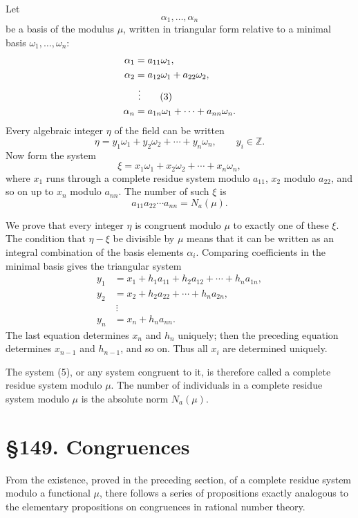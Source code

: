 \documentclass[11pt,a4paper]{book}
\newcommand{\webersection}[2]{\clearpage\section*{\S #1. #2}}
\begin{document}
Let
\begin{equation}
 \alpha_1,
\ldots,
\alpha_n \tag{2}
\end{equation}
be a basis of the modulus \(\mu\), written in triangular form relative to a minimal basis \(\omega_1,
\ldots,
\omega_n\):
\begin{align}
 \alpha_1&=a_{11}\omega_1,\notag\\
 \alpha_2&=a_{12}\omega_1+a_{22}\omega_2,\notag\\
 &\ \vdots \tag{3}\\
 \alpha_n&=a_{1n}\omega_1+
\cdots+a_{nn}\omega_n.
\notag
\end{align}
Every algebraic integer \(\eta\) of the field can be written
\begin{equation}
 \eta=y_1\omega_1+y_2\omega_2+
\cdots+y_n\omega_n,
\qquad y_i\in\mathbb Z. \tag{4}
\end{equation}
Now form the system
\begin{equation}
 \xi=x_1\omega_1+x_2\omega_2+
\cdots+x_n\omega_n, \tag{5}
\end{equation}
where \(x_1\) runs through a complete residue system modulo \(a_{11}\), \(x_2\) modulo \(a_{22}\), and so on up to \(x_n\) modulo \(a_{nn}\).  The number of such \(\xi\) is
\[
 a_{11}a_{22}\cdots a_{nn}=N_a(\mu).
\]

We prove that every integer \(\eta\) is congruent modulo \(\mu\) to exactly one of these \(\xi\).  The condition that \(\eta-
\xi\) be divisible by \(\mu\) means that it can be written as an integral combination of the basis elements \(\alpha_i\).  Comparing coefficients in the minimal basis gives the triangular system
\begin{align*}
 y_1&=x_1+h_1a_{11}+h_2a_{12}+
\cdots+h_na_{1n},\\
 y_2&=x_2+h_2a_{22}+
\cdots+h_na_{2n},\\
 &\ \vdots\\
 y_n&=x_n+h_na_{nn}.
\end{align*}
The last equation determines \(x_n\) and \(h_n\) uniquely; then the preceding equation determines \(x_{n-1}\) and \(h_{n-1}\), and so on.  Thus all \(x_i\) are determined uniquely.

The system (5), or any system congruent to it, is therefore called a complete residue system modulo \(\mu\).  The number of individuals in a complete residue system modulo \(\mu\) is the absolute norm \(N_a(\mu)\).

\webersection{149}{Congruences}

From the existence, proved in the preceding section, of a complete residue system modulo a functional \(\mu\), there follows a series of propositions exactly analogous to the elementary propositions on congruences in rational number theory.
\end{document}
